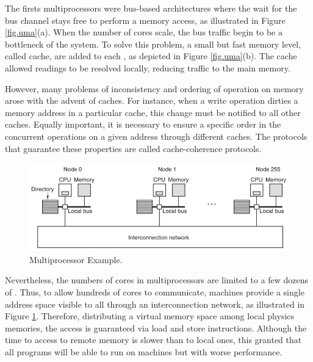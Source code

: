 			The firsts \uma multiprocessors were bus-based architectures where
			the \cpu wait for the bus channel stays free to perform a memory
			access, as illustrated in Figure \ref{fig.uma}(a).
			When the number of cores scale, the bus traffic begin to be a
			bottleneck of the system.
			To solve this problem, a small but fast memory level, called cache,
			are added to each \cpu, as depicted in Figure \ref{fig.uma}(b).
			The cache allowed readings to be resolved locally, reducing traffic
			to the main memory.

			However, many problems of inconsistency and ordering of operation
			on memory arose with the advent of caches.
			For instance, when a write operation dirties a memory address in
			a particular cache, this change must be notified to all other caches.
			Equally important, it is necessary to ensure a specific order in
			the concurrent operations on a given address through different caches.
			The protocols that guarantee these properties are called cache-coherence protocols.

			\begin{figure}[h]
				\centering
				\includegraphics[width=.8\textwidth]{images/numa.png}

				\caption{
					\numa Multiprocessor Example.
				}\par
				\label{fig.numa}
			\end{figure}

			Nevertheless, the numbers of cores in \uma multiprocessors are limited
			to a few dozens of \cpus.
			Thus, to allow hundreds of cores to communicate, \numa machines provide
			a single address space visible to all \cpus through an interconnection
			network,  as illustrated in Figure \ref{fig.numa}.
			Therefore, distributing a virtual memory space among local physics memories,
			the access is guaranteed via load and store instructions.
			Although the time to access to remote memory is slower than to local ones,
			this granted that all \uma programs will be able to run on \numa machines
			but with worse performance.

